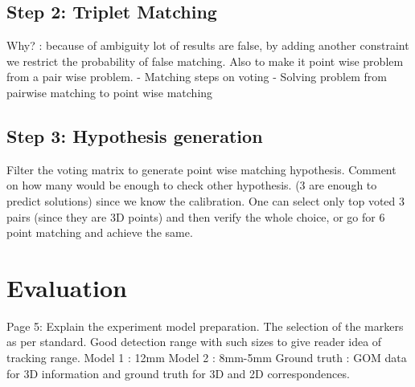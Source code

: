 \documentclass{bmvc2k}
\begin{document}
\subsection{Step 2: Triplet Matching}
Why? : because of ambiguity lot of results are false, by adding another constraint we restrict the probability of false matching. Also to make it point wise problem from a pair wise problem. 
- Matching steps on voting 
- Solving problem from pairwise matching to point wise matching
\subsection{Step 3: Hypothesis generation}
Filter the voting matrix to generate point wise matching hypothesis. 
Comment on how many would be enough to check other hypothesis. 
(3 are enough to predict solutions) since we know the calibration. 
One can select only top voted 3 pairs (since they are 3D points) and then verify the whole choice, or go for 6 point matching and achieve the same.



\section{Evaluation}
Page 5: 
Explain the experiment model preparation. The selection of the markers as per standard. Good detection range with such sizes to give reader idea of tracking range. 
Model 1 : 12mm 
Model 2 : 8mm-5mm 
Ground truth : GOM data for 3D information and ground truth for 3D and 2D correspondences. 
\end{document}
